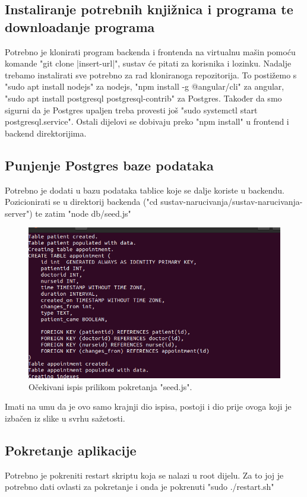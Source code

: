     \subsection{Instaliranje potrebnih knjižnica i programa te downloadanje programa}
    Potrebno je klonirati program backenda i frontenda na virtualnu mašin pomoću komande "git clone |insert-url|", sustav će pitati za korisnika i lozinku. Nadalje trebamo instalirati sve potrebno za rad kloniranoga repozitorija. To postižemo s "sudo apt install nodejs" za nodejs, "npm install -g @angular/cli" za angular, "sudo apt install postgresql postgresql-contrib" za Postgres. Također da smo sigurni da je Postgres upaljen treba provesti još "sudo systemctl start postgresql.service". Ostali dijelovi se dobivaju preko "npm install" u frontend i backend direktorijima.

    \subsection{Punjenje Postgres baze podataka}
    Potrebno je dodati u bazu podataka tablice koje se dalje koriste u backendu. Pozicionirati se u direktorij backenda ("cd sustav-narucivanja/sustav-narucivanja-server") te zatim "node db/seed.js"
    \begin{figure}[H]
        \includegraphics[width=\textwidth]{slike/deploy/seed.png} %
        \caption{Očekivani ispis prilikom pokretanja "seed.js".}
        \label{fig:struktura} %
    \end{figure}
     Imati na umu da je ovo samo krajnji dio ispisa, postoji i dio prije ovoga koji je izbačen iz slike u svrhu sažetosti.

    \subsection{Pokretanje aplikacije}
    Potrebno je pokreniti restart skriptu koja se nalazi u root dijelu. Za to joj je potrebno dati ovlasti za pokretanje i onda je pokrenuti "sudo ./restart.sh"
			

			
			\eject 
